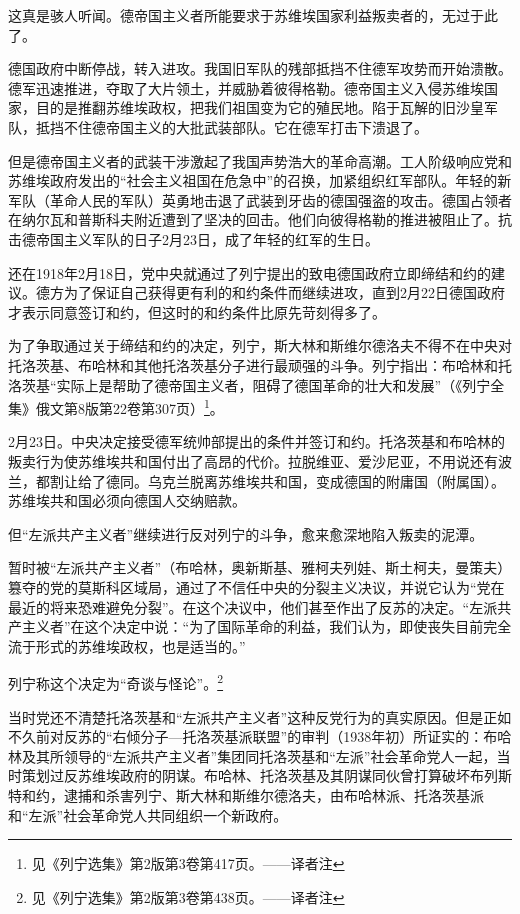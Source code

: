 这真是骇人听闻。德帝国主义者所能要求于苏维埃国家利益叛卖者的，无过于此了。

德国政府中断停战，转入进攻。我国旧军队的残部抵挡不住德军攻势而开始溃散。德军迅速推进，夺取了大片领土，并威胁着彼得格勒。德帝国主义入侵苏维埃国家，目的是推翻苏维埃政权，把我们祖国变为它的殖民地。陷于瓦解的旧沙皇军队，抵挡不住德帝国主义的大批武装部队。它在德军打击下溃退了。

但是德帝国主义者的武装干涉激起了我国声势浩大的革命高潮。工人阶级响应党和苏维埃政府发出的“社会主义祖国在危急中”的召换，加紧组织红军部队。年轻的新军队（革命人民的军队）英勇地击退了武装到牙齿的德国强盗的攻击。德国占领者在纳尔瓦和普斯科夫附近遭到了坚决的回击。他们向彼得格勒的推进被阻止了。抗击德帝国主义军队的日子2月23日，成了年轻的红军的生日。

还在1918年2月18日，党中央就通过了列宁提出的致电德国政府立即缔结和约的建议。德方为了保证自己获得更有利的和约条件而继续进攻，直到2月22日德国政府才表示同意签订和约，但这时的和约条件比原先苛刻得多了。

为了争取通过关于缔结和约的决定，列宁，斯大林和斯维尔德洛夫不得不在中央对托洛茨基、布哈林和其他托洛茨基分子进行最顽强的斗争。列宁指出：布哈林和托洛茨基“实际上是帮助了德帝国主义者，阻碍了德国革命的壮大和发展”（《列宁全集》俄文第8版第22卷第307页）\footnote{见《列宁选集》第2版第3卷第417页。——译者注}。

2月23日。中央决定接受德军统帅部提出的条件并签订和约。托洛茨基和布哈林的叛卖行为使苏维埃共和国付出了高昂的代价。拉脱维亚、爱沙尼亚，不用说还有波兰，都割让给了德同。乌克兰脱离苏维埃共和国，变成德国的附庸国（附属国）。苏维埃共和国必须向德国人交纳赔款。

但“左派共产主义者”继续进行反对列宁的斗争，愈来愈深地陷入叛卖的泥潭。

暂时被“左派共产主义者”（布哈林，奥新斯基、雅柯夫列娃、斯土柯夫，曼策夫）篡夺的党的莫斯科区域局，通过了不信任中央的分裂主义决议，并说它认为“党在最近的将来恐难避免分裂”。在这个决议中，他们甚至作出了反苏的决定。“左派共产主义者”在这个决定中说：“为了国际革命的利益，我们认为，即使丧失目前完全流于形式的苏维埃政权，也是适当的。”

列宁称这个决定为“奇谈与怪论”。\footnote{见《列宁选集》第2版第3卷第438页。——译者注}

当时党还不清楚托洛茨基和“左派共产主义者”这种反党行为的真实原因。但是正如不久前对反苏的“右倾分子—托洛茨基派联盟”的审判（1938年初）所证实的：布哈林及其所领导的“左派共产主义者”集团同托洛茨基和“左派”社会革命党人一起，当时策划过反苏维埃政府的阴谋。布哈林、托洛茨基及其阴谋同伙曾打算破坏布列斯特和约，逮捕和杀害列宁、斯大林和斯维尔德洛夫，由布哈林派、托洛茨基派和“左派”社会革命党人共同组织一个新政府。

